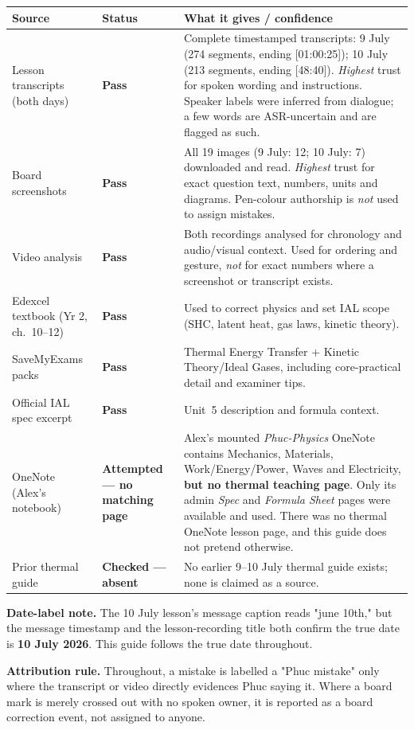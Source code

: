 \documentclass[11pt,a4paper]{article}
\newcommand{\ts}[1]{\textup{[#1]}}       %
\begin{document}
\begin{longtable}{@{}p{3.4cm}p{2.0cm}p{9.3cm}@{}}
\toprule
\textbf{Source} & \textbf{Status} & \textbf{What it gives / confidence} \\
\midrule
\endhead
Lesson transcripts (both days) & \textbf{Pass} & Complete timestamped transcripts:
9 July (274 segments, ending \ts{01:00:25}); 10 July (213 segments, ending
\ts{48:40}). \emph{Highest} trust for spoken wording and instructions. Speaker labels
were inferred from dialogue; a few words are ASR-uncertain and are flagged as such. \\
\addlinespace
Board screenshots & \textbf{Pass} & All 19 images (9 July: 12; 10 July: 7) downloaded
and read. \emph{Highest} trust for exact question text, numbers, units and diagrams.
Pen-colour authorship is \emph{not} used to assign mistakes. \\
\addlinespace
Video analysis & \textbf{Pass} & Both recordings analysed for chronology and
audio/visual context. Used for ordering and gesture, \emph{not} for exact numbers where
a screenshot or transcript exists. \\
\addlinespace
Edexcel textbook (Yr 2, ch.\ 10--12) & \textbf{Pass} & Used to correct physics and set
IAL scope (SHC, latent heat, gas laws, kinetic theory). \\
\addlinespace
SaveMyExams packs & \textbf{Pass} & Thermal Energy Transfer + Kinetic Theory/Ideal
Gases, including core-practical detail and examiner tips. \\
\addlinespace
Official IAL spec excerpt & \textbf{Pass} & Unit~5 description and formula context. \\
\addlinespace
OneNote (Alex's notebook) & \textbf{Attempted --- no matching page} & Alex's mounted
\textit{Phuc-Physics} OneNote contains Mechanics, Materials, Work/Energy/Power, Waves
and Electricity, \textbf{but no thermal teaching page}. Only its admin
\textit{Spec} and \textit{Formula Sheet} pages were available and used. There was no
thermal OneNote lesson page, and this guide does not pretend otherwise. \\
\addlinespace
Prior thermal guide & \textbf{Checked --- absent} & No earlier 9--10 July thermal guide
exists; none is claimed as a source. \\
\bottomrule
\end{longtable}

\begin{plainbox}
\textbf{Date-label note.} The 10 July lesson's message caption reads "june 10th," but the
message timestamp and the lesson-recording title both confirm the true date is
\textbf{10 July 2026}. This guide follows the true date throughout.

\smallskip
\textbf{Attribution rule.} Throughout, a mistake is labelled a "Phuc mistake" only where
the transcript or video directly evidences Phuc saying it. Where a board mark is
merely crossed out with no spoken owner, it is reported as a board correction event, not
assigned to anyone.
\end{plainbox}
\end{document}
